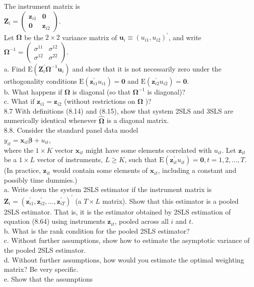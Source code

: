 \documentclass[10pt]{article}
\begin{document}
The instrument matrix is\\
$\mathbf{Z}_{i}=\left(\begin{array}{cc}\mathbf{z}_{i 1} & \mathbf{0} \\ \mathbf{0} & \mathbf{z}_{i 2}\end{array}\right)$.\\
Let $\boldsymbol{\Omega}$ be the $2 \times 2$ variance matrix of $\mathbf{u}_{i} \equiv\left(u_{i 1}, u_{i 2}\right)^{\prime}$, and write\\
$\boldsymbol{\Omega}^{-1}=\left(\begin{array}{cc}\sigma^{11} & \sigma^{12} \\ \sigma^{12} & \sigma^{22}\end{array}\right)$.\\
a. Find $\mathrm{E}\left(\mathbf{Z}_{i}^{\prime} \boldsymbol{\Omega}^{-1} \mathbf{u}_{i}\right)$ and show that it is not necessarily zero under the orthogonality conditions $\mathrm{E}\left(\mathbf{z}_{i 1}^{\prime} u_{i 1}\right)=\mathbf{0}$ and $\mathrm{E}\left(\mathbf{z}_{i 2}^{\prime} u_{i 2}\right)=\mathbf{0}$.\\
b. What happens if $\boldsymbol{\Omega}$ is diagonal (so that $\boldsymbol{\Omega}^{-1}$ is diagonal)?\\
c. What if $\mathbf{z}_{i 1}=\mathbf{z}_{i 2}$ (without restrictions on $\boldsymbol{\Omega}$ )?\\
8.7 With definitions (8.14) and (8.15), show that system 2SLS and 3SLS are numerically identical whenever $\hat{\boldsymbol{\Omega}}$ is a diagonal matrix.\\
8.8. Consider the standard panel data model\\
$y_{i t}=\mathbf{x}_{i t} \boldsymbol{\beta}+u_{i t}$,\\
where the $1 \times K$ vector $\mathbf{x}_{i t}$ might have some elements correlated with $u_{i t}$. Let $\mathbf{z}_{i t}$ be a $1 \times L$ vector of instruments, $L \geq K$, such that $\mathrm{E}\left(\mathbf{z}_{i t}^{\prime} u_{i t}\right)=\mathbf{0}, t=1,2, \ldots, T$. (In practice, $\mathbf{z}_{i t}$ would contain some elements of $\mathbf{x}_{i t}$, including a constant and possibly time dummies.)\\
a. Write down the system 2SLS estimator if the instrument matrix is $\mathbf{Z}_{i}= \left(\mathbf{z}_{i 1}^{\prime}, \mathbf{z}_{i 2}^{\prime}, \ldots, \mathbf{z}_{i T}^{\prime}\right)^{\prime}$ (a $T \times L$ matrix). Show that this estimator is a pooled 2SLS estimator. That is, it is the estimator obtained by 2SLS estimation of equation (8.64) using instruments $\mathbf{z}_{i t}$, pooled across all $i$ and $t$.\\
b. What is the rank condition for the pooled 2SLS estimator?\\
c. Without further assumptions, show how to estimate the asymptotic variance of the pooled 2SLS estimator.\\
d. Without further assumptions, how would you estimate the optimal weighting matrix? Be very specific.\\
e. Show that the assumptions
\end{document}
